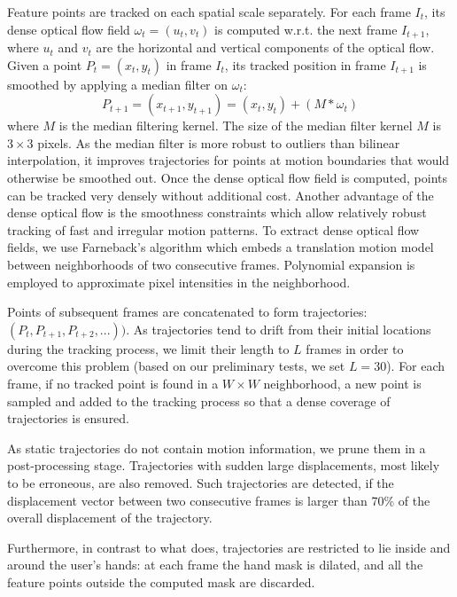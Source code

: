 Feature points are tracked on each spatial scale separately. For each frame $I_t$, its dense optical flow field
$\omega_t = (u_t, v_t)$ is computed w.r.t. the next frame $I_{t+1}$, where $u_t$ and $v_t$ are the horizontal and vertical
components of the optical flow. Given a point $P_t = (x_t, y_t)$ in frame $I_t$, its tracked position in frame $I_{t+1}$
is smoothed by applying a median filter on $\omega_t$:
\begin{equation}
P_{t+1} = (x_{t+1}, y_{t+1}) = (x_t, y_t) + (M * \omega_t)
\end{equation}
where $M$ is the median filtering kernel. The size of the median filter kernel $M$ is $3 \times 3$ pixels. As the
median filter is more robust to outliers than bilinear interpolation, it improves trajectories
for points at motion boundaries that would otherwise be smoothed out.
Once the dense optical flow field is computed, points can be tracked very densely without additional
cost. Another advantage of the dense optical flow is the smoothness constraints which allow relatively
robust tracking of fast and irregular motion patterns. To extract dense optical flow fields, we
use Farneback's algorithm \cite{farneback2003two} which embeds a translation motion model between neighborhoods of two consecutive
frames. Polynomial expansion is employed to approximate pixel intensities in the neighborhood.

Points of subsequent frames are concatenated to form trajectories: $(P_t,  P_{t+1}, P_{t+2}, ...))$. As trajectories
tend to drift from their initial locations during the tracking process, we limit their length to $L$ frames
in order to overcome this problem (based on our preliminary tests, we set $L=30$). For each frame, if no tracked point is found
in a $W \times W$ neighborhood, a new point is sampled and added to the tracking process so that a dense coverage
of trajectories is ensured.

As static trajectories do not contain motion information, we prune them in a post-processing stage.
Trajectories with sudden large displacements, most likely to be erroneous, are also removed. Such trajectories
are detected, if the displacement vector between two consecutive frames is larger than 70\% of the
overall displacement of the trajectory.

Furthermore, in contrast to what \cite{wang:2011:inria-00583818:1} does, trajectories are restricted to lie inside and around the user's hands: at each frame the hand mask is dilated, and all the feature points outside the computed mask are discarded.


